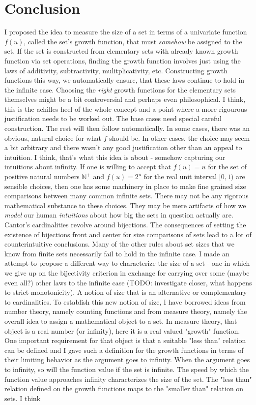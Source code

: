 \documentclass[12pt]{article}
\begin{document}
\section{Conclusion}
I proposed the idea to measure the size of a set in terms of a univariate function $f(u)$, called the set's growth function, that must \emph{somehow} be assigned to the set. If the set is constructed from elementary sets with already known growth function via set operations, finding the growth function involves just using the laws of additivity, subtractivity, mulitplicativity, etc. Constructing growth functions this way, we automatically ensure, that these laws continue to hold in the infinite case. Choosing the \emph{right} growth functions for the elementary sets themselves might be a bit controversial and perhaps even philosophical. I think, this is the achilles heel of the whole concept and a point where a more rigourous justification needs to be worked out. The base cases need special careful construction. The rest will then follow automatically. In some cases, there was an obvious, natural choice for what $f$ should be. In other cases, the choice may seem a bit arbitrary and there wasn't any good justification other than an appeal to intuition. I think, that's what this idea is about - somehow capturing our intuitions about infinity. If one is willing to accept that $f(u) = u$ for the set of positive natural numbers $\mathbb{N}^+$ and $f(u) = 2^u$ for the real unit interval $[0,1)$ are sensible choices, then one has some machinery in place to make fine grained size comparisons between many common infinite sets. There may not be any rigorous mathematical substance to these choices. They may be mere artifacts of how we \emph{model} our human \emph{intuitions} about how big the sets in question actually are. Cantor's cardinalities revolve around bijections. The consequences of setting the existence of bijections front and center for size comparisons of sets lead to a lot of counterintuitive conclusions. Many of the other rules about set sizes that we know from finite sets necessarily fail to hold in the infinite case. I made an attempt to propose a different way to characterize the size of a set - one in which we give up on the bijectivity criterion in exchange for carrying over some (maybe even all?) other laws to the infinite case (TODO: investigate closer, what happens to strict monotonicity). A notion of size that is an alternative or complementary to cardinalities. To establish this new notion of size, I have borrowed ideas from number theory, namely counting functions and from measure theory, namely the overall idea to assign a mathematical object to a set. In measure theory, that object is a real number (or infinity), here it is a real valued "growth" function. One important requirement for that object is that a suitable "less than" relation can be defined and I gave such a definition for the growth functions in terms of their limiting behavior as the argument goes to infinity. When the argument goes to infinity, so will the function value if the set is infinite. The speed by which the function value approaches infinity characterizes the size of the set. The "less than" relation defined on the growth functions maps to the "smaller than" relation on sets. I think 
\end{document}
